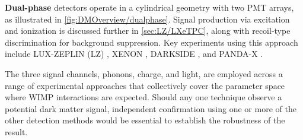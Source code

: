 \begin{itemize}
    \textbf{Dual-phase} detectors operate in a cylindrical geometry with two PMT arrays, as illustrated in \autoref{fig:DMOverview/dualphase}. Signal production via excitation and ionization is discussed further in \autoref{sec:LZ/LXeTPC}, along with recoil-type discrimination for background suppression. Key experiments using this approach include LUX-ZEPLIN (LZ) \cite{LZNIMA}, XENON \cite{XENON:2025vwd}, DARKSIDE \cite{DarkSide-20k:2017zyg}, and PANDA-X \cite{PandaX-4T:2021bab}.
\end{itemize}
\noindent
The three signal channels, phonons, charge, and light, are employed across a range of experimental approaches that collectively cover the parameter space where WIMP interactions are expected. Should any one technique observe a potential dark matter signal, independent confirmation using one or more of the other detection methods would be essential to establish the robustness of the result.

